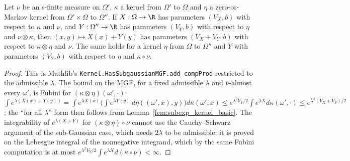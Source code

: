 \begin{lemma}\label{lem:subexp_add_compProd}
\leanok
{}
Let $\nu$ be an s-finite measure on $\Omega'$, $\kappa$ a kernel from $\Omega'$ to $\Omega$
and $\eta$ a zero-or-Markov kernel from $\Omega'\times\Omega$ to $\Omega''$. If
$X : \Omega\to\R$ has parameters $(V_X, b)$ with respect to $\kappa$ and $\nu$, and
$Y : \Omega''\to\R$ has parameters $(V_Y, b)$ with respect to $\eta$ and $\nu\otimes\kappa$,
then $(x, y) \mapsto X(x) + Y(y)$ has parameters $(V_X + V_Y, b)$ with respect to
$\kappa\otimes\eta$ and $\nu$. The same holds for a kernel $\eta$ from $\Omega$ to $\Omega''$
and $Y$ with parameters $(V_Y, b)$ with respect to $\eta$ and $\kappa\circ\nu$.
\end{lemma}

\begin{proof}
\leanok
{}
This is Mathlib's \texttt{Kernel.HasSubgaussianMGF.add\_compProd} restricted to the
admissible $\lambda$. The bound on the MGF, for a fixed admissible $\lambda$ and
$\nu$-almost every $\omega'$, is Fubini for $(\kappa\otimes\eta)(\omega',\cdot)$:
$\int e^{\lambda(X(x)+Y(y))} = \int e^{\lambda X(x)}\big(\int e^{\lambda Y(y)}\,d\eta((\omega',x),y)\big)d\kappa(\omega',x)
\le e^{\lambda^2V_Y/2}\int e^{\lambda X}d\kappa(\omega',\cdot) \le e^{\lambda^2(V_X+V_Y)/2}$;
the ``for all $\lambda$'' form then follows from Lemma~\ref{lem:subexp_kernel_basic}. The
integrability of $e^{\lambda(X+Y)}$ for $(\kappa\otimes\eta)\circ\nu$ cannot use the
Cauchy--Schwarz argument of the sub-Gaussian case, which needs $2\lambda$ to be admissible: it
is proved on the Lebesgue integral of the nonnegative integrand, which by the same Fubini
computation is at most $e^{\lambda^2V_Y/2}\int e^{\lambda X}d(\kappa\circ\nu) < \infty$.
\end{proof}


